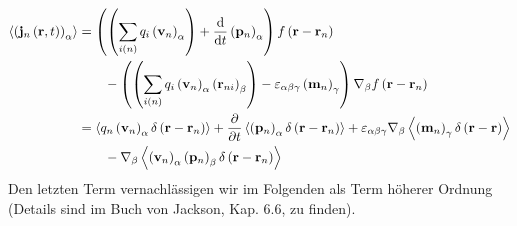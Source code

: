 \begin{align*}
	\left\langle \left(\mathbf{j}_{n}\left(\mathbf{r},t\right)\right)_{\alpha }\right\rangle &=\left(\left(\sum _{i\left(n\right)}q_{i}\left(\mathbf{v}_{n}\right)_{\alpha }\right)+\frac{\text{d} }{\text{d} t}\left(\mathbf{p}_{n}\right)_{\alpha }\right)f\left(\mathbf{r}-\mathbf{r}_{n}\right)\\
	&\qquad-\left(\left(\sum _{i\left(n\right)}q_{i}\left(\mathbf{v}_{n}\right)_{\alpha }\left(\mathbf{r}_{ni}\right)_{\beta }\right)-\varepsilon _{\alpha \beta \gamma }\left(\mathbf{m}_{n}\right)_{\gamma }\right)\nabla _{\beta }f\left(\mathbf{r}-\mathbf{r}_{n}\right) \\
	&=\left\langle q_{n}\left(\mathbf{v}_{n}\right)_{\alpha }\delta \left(\mathbf{r}-\mathbf{r}_{n}\right)\right\rangle +\frac{\partial }{\partial t}\left\langle \left(\mathbf{p}_{n}\right)_{\alpha }\delta \left(\mathbf{r}-\mathbf{r}_{n}\right)\right\rangle +\varepsilon _{\alpha \beta \gamma }\nabla _{\beta }\left\langle \left(\mathbf{m}_{n}\right)_{\gamma }\delta \left(\mathbf{r}-\mathbf{r}\right)\right\rangle\\
	&\qquad -\nabla _{\beta }\left\langle \left(\mathbf{v}_{n}\right)_{\alpha }\left(\mathbf{p}_{n}\right)_{\beta }\delta \left(\mathbf{r}-\mathbf{r}_{n}\right)\right\rangle
\end{align*}
Den letzten Term vernachlässigen wir im Folgenden als Term höherer Ordnung (Details sind im Buch von Jackson, Kap. 6.6, zu finden).

